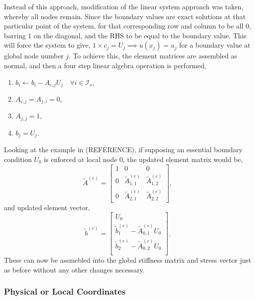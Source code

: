 Instead of this approach, modification of the linear system approach was taken, whereby all nodes remain. Since the boundary values are exact solutions at that particular point of the system, for that corresponding row and column to be all $0$, barring $1$ on the diagonal, and the RHS to be equal to the boundary value. This will force the system to give, $1 \times c_j = U_j \implies u(x_j) = u_j$ for a boundary value at global node number $j$. To achieve this, the element matrices are assembled as normal, and then a four step linear algebra operation is performed,
\begin{enumerate}
	\item $b_i \leftarrow b_i - A_{i,j}U_j\quad\forall i \in \mathcal{I}_s,$
	\item $A_{i,j} = A_{j,i} = 0$,
	\item $A_{j,j} = 1$,
	\item $b_j = U_j$.
\end{enumerate}
Looking at the example in (REFERENCE), if supposing an essential boundary condition $U_0$ is enforced at local node $0$, the updated element matrix would be,
\begin{equation}
	\tilde{A}^{(e)} =
	\left[\begin{matrix} 
		1 & 0 & 0 \\
		0 & \tilde{A}^{(e)}_{1,1} & \tilde{A}^{(e)}_{1,2} \\
		0 & \tilde{A}^{(e)}_{2,1} & \tilde{A}^{(e)}_{2,2}
	\end{matrix}\right],
\end{equation}
and updated element vector,
\begin{equation}
	\tilde{b}^{(e)} =
	\left[\begin{matrix}
		U_0 \\
		\tilde{b}^{(e)}_1 - \tilde{A}^{(e)}_{0,1} U_0 \\
		\tilde{b}^{(e)}_2 -\tilde{A}^{(e)}_{0,2} U_0 \\
	\end{matrix}\right].
\end{equation}
These can now be assmebled into the global stiffness matrix and stress vector just as before without any other changes necessary.

\subsubsection{Physical or Local Coordinates}


